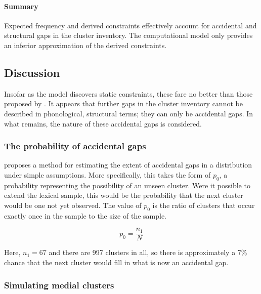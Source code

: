 \paragraph{Summary}
Expected frequency and derived constraints effectively account for 
accidental and structural gaps in the cluster inventory.
The \citet{Hayes2008a} computational model only provides an inferior approximation of the derived constraints.

\subsection{Discussion}

Insofar as the \citet{Hayes2008a} model discovers static constraints, these fare no better than those proposed by \citet{Pierrehumbert1994}.
It appears that further gaps in the cluster inventory cannot be described in phonological, structural terms; they can only be accidental gaps.
In what remains, the nature of these accidental gaps is considered.

\subsubsection{The probability of accidental gaps}

\citet{Good1953} proposes a method for estimating the extent of accidental gaps in a distribution under simple assumptions. More specifically, this takes the form of $p_0$, a probability representing the possibility of an unseen cluster. Were it possible to extend the lexical sample, this would be the probability that the next cluster would be one not yet observed.
The value of $p_0$ is the ratio of clusters that occur exactly once in the sample to the size of the sample.

\begin{equation*}
\displaystyle p_0 = \frac{n_1}{N}
\end{equation*}

\noindent
Here, $n_1 = 67$ and there are 997 clusters in all, so there is approximately a 7\% chance that the next cluster would fill in what is now an accidental gap.

\subsubsection{Simulating medial clusters}
\label{simulate}

